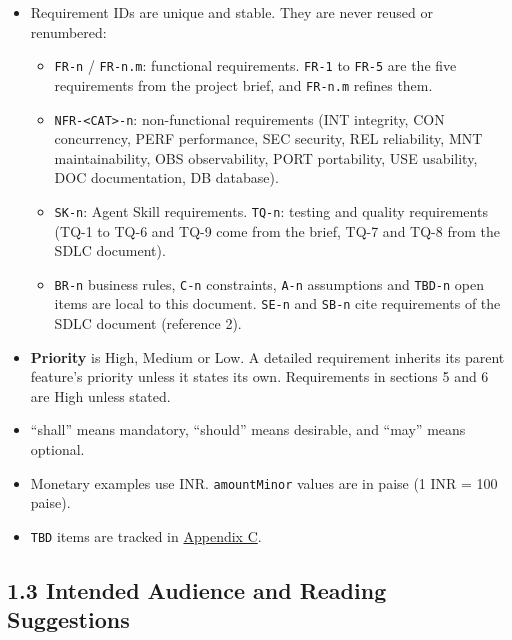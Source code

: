 \documentclass[11pt,a4paper]{article}
\providecommand{\tightlist}{\setlength{\itemsep}{2pt}\setlength{\parskip}{0pt}}
\begin{document}
\begin{itemize}
\tightlist
\item
  Requirement IDs are unique and stable. They are never reused or renumbered:

  \begin{itemize}
  \tightlist
  \item
    \texttt{FR-n} / \texttt{FR-n.m}: functional requirements. \texttt{FR-1} to \texttt{FR-5} are the five requirements from the
    project brief, and \texttt{FR-n.m} refines them.
  \item
    \texttt{NFR-\textless{}CAT\textgreater{}-n}: non-functional requirements (INT integrity, CON concurrency, PERF performance,
    SEC security, REL reliability, MNT maintainability, OBS observability, PORT portability, USE
    usability, DOC documentation, DB database).
  \item
    \texttt{SK-n}: Agent Skill requirements. \texttt{TQ-n}: testing and quality requirements (TQ-1 to TQ-6 and
    TQ-9 come from the brief, TQ-7 and TQ-8 from the SDLC document).
  \item
    \texttt{BR-n} business rules, \texttt{C-n} constraints, \texttt{A-n} assumptions and \texttt{TBD-n} open items are local to
    this document. \texttt{SE-n} and \texttt{SB-n} cite requirements of the SDLC document (reference 2).
  \end{itemize}
\item
  \textbf{Priority} is High, Medium or Low. A detailed requirement inherits its parent feature's
  priority unless it states its own. Requirements in sections 5 and 6 are High unless stated.
\item
  ``shall'' means mandatory, ``should'' means desirable, and ``may'' means optional.
\item
  Monetary examples use INR. \texttt{amountMinor} values are in paise (1 INR = 100 paise).
\item
  \texttt{TBD} items are tracked in \hyperref[appendix-c-to-be-determined-list]{Appendix C}.
\end{itemize}

\subsection{1.3 Intended Audience and Reading Suggestions}\label{intended-audience-and-reading-suggestions}
\end{document}
